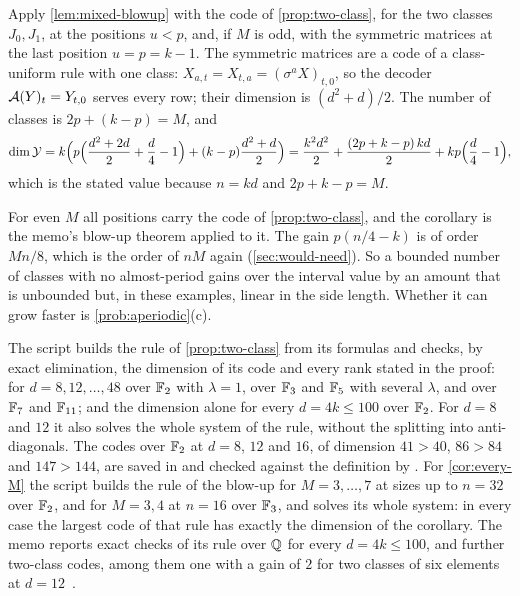 \begin{informalproof}
Apply \cref{lem:mixed-blowup} with the code of \cref{prop:two-class}, for the two classes $J_0,J_1$, at the positions
$u<p$, and, if $M$ is odd, with the symmetric matrices at the last position $u=p=k-1$. The symmetric matrices are a
code of a class-uniform rule with one class: $X_{a,t}=X_{t,a}=(\sigma^aX)_{t,0}$, so the decoder $\mathcal{A}(Y)_t=Y_{t,0}$
serves every row; their dimension is $(d^2+d)/2$. The number of classes is $2p+(k-p)=M$, and
\[
  \dim\mathcal Y=k\Bigl(p\Bigl(\frac{d^2+2d}2+\frac d4-1\Bigr)+(k-p)\frac{d^2+d}2\Bigr)
  =\frac{k^2d^2}2+\frac{(2p+k-p)\,kd}2+kp\Bigl(\frac d4-1\Bigr),
\]
which is the stated value because $n=kd$ and $2p+k-p=M$.
\end{informalproof}

For even $M$ all positions carry the code of \cref{prop:two-class}, and the corollary is the memo's blow-up theorem
applied to it. The gain $p(n/4-k)$ is of order $Mn/8$, which is the order of $nM$ again
(\cref{sec:would-need}). So a bounded number of classes with no almost-period gains over the interval value by an
amount that is unbounded but, in these examples, linear in the side length. Whether it can grow faster is
\cref{prob:aperiodic}(c).

\begin{remark}\label{rem:two-class}
The script  builds the rule of \cref{prop:two-class} from its formulas and checks,
by exact elimination, the dimension of its code and every rank stated in the proof: for $d=8,12,\dots,48$ over $\mathbb{F}_2$
with $\lambda=1$, over $\mathbb{F}_3$ and $\mathbb{F}_5$ with several $\lambda$, and over $\mathbb{F}_7$ and $\mathbb{F}_{11}$; and the dimension alone
for every $d=4k\le100$ over $\mathbb{F}_2$. For $d=8$ and $12$ it also solves the whole system of the rule, without the
splitting into anti-diagonals. The codes over $\mathbb{F}_2$ at $d=8$, $12$ and $16$, of dimension $41>40$, $86>84$ and
$147>144$, are saved in  and checked against the definition by
. For \cref{cor:every-M} the script builds the rule of the blow-up for
$M=3,\dots,7$ at sizes up to $n=32$ over $\mathbb{F}_2$, and for $M=3,4$ at $n=16$ over $\mathbb{F}_3$, and solves its whole system: in
every case the largest code of that rule has exactly the dimension of the corollary. The memo reports exact checks of
its rule over $\mathbb{Q}$ for every $d=4k\le100$, and further two-class codes, among them one with a gain of $2$ for two
classes of six elements at $d=12$~\cite[Remark~4.11]{ClassUniformMemo2026}.
\end{remark}


